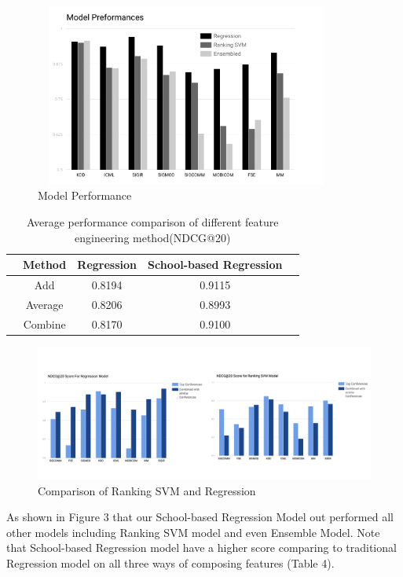 \documentclass[letterpaper]{article}
\begin{document}
\begin{figure}[!h]
    \centering
    \includegraphics[width=10cm,height=6cm]{modelPerformace.png}
    \caption{Model Performance}
    \label{fig:my_label}
\end{figure}

\begin{table}[!h]
\centering\scriptsize
\caption{Average performance comparison of different feature engineering method(NDCG@20)
\newline}
    \begin{tabular}{ccccc}
    \hline
          & Method& Regression&School-based Regression\\
    \hline
        &Add& 0.8194& 0.9115\\
        &Average& 0.8206& 0.8993\\
        &Combine& 0.8170& 0.9100\\
    \hline
\end{tabular}%
\end{table}%

\begin{figure}[!ht]
    \centering
    \includegraphics[width=\linewidth]{combined.png}
    \caption{Comparison of Ranking SVM and Regression}
    \label{fig:my_label}
\end{figure}
As shown in Figure 3 that our School-based Regression Model out performed all other models including Ranking SVM model and even Ensemble Model. Note that School-based Regression model have a higher score comparing to traditional Regression model on all three ways of composing features (Table 4).
\end{document}
